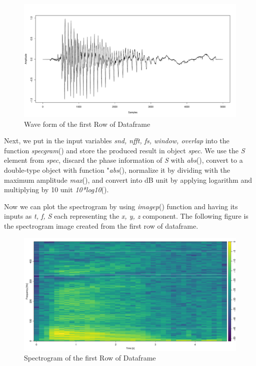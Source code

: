 \begin{figure}[H]
    \centering
    \includegraphics[width=12cm]{images/Spectrum/1RowWave.pdf}
    \caption{Wave form of the first Row of Dataframe}
    \label{fig:1RowWave} 
\end{figure}

Next, we put in the input variables \emph{snd, nfft, fs, window, overlap} into the function \emph{specgram}() and store the produced result in object \emph{spec}. We use the \emph{S} element from \emph{spec}, discard the phase information of \emph{S} with \emph{abs}(), convert to a double-type object with function "\emph{abs}(), normalize it by dividing with the maximum amplitude \emph{max}(), and convert into dB unit by applying logarithm and multiplying by 10 unit \emph{10*log10}().

Now we can plot the spectrogram by using \emph{imagep}() function and having its inputs as \emph{t, f, S} each representing the \emph{x, y, z} component. The following figure is the spectrogram image created from the first row of dataframe.

\begin{figure}[H]
    \centering
    \includegraphics[width=12cm]{images/Spectrum/1Row Spec.pdf}
    \caption{Spectrogram of the first Row of Dataframe}
    \label{fig:1RowSpec} 
\end{figure}

